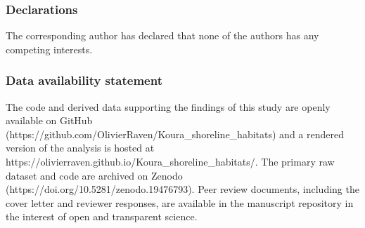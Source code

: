 \documentclass[
  letterpaper,
  DIV=11,
  numbers=noendperiod]{scrartcl}
\newcounter{none} %
\begin{document}
\subsubsection{Declarations}\label{declarations}

The corresponding author has declared that none of the authors has any
competing interests.

\subsubsection{Data availability
statement}\label{data-availability-statement}

The code and derived data supporting the findings of this study are
openly available on GitHub
(https://github.com/OlivierRaven/Koura\_shoreline\_habitats) and a
rendered version of the analysis is hosted at
https://olivierraven.github.io/Koura\_shoreline\_habitats/. The primary
raw dataset and code are archived on Zenodo
(https://doi.org/10.5281/zenodo.19476793). Peer review documents,
including the cover letter and reviewer responses, are available in the
manuscript repository in the interest of open and transparent science.
\end{document}
